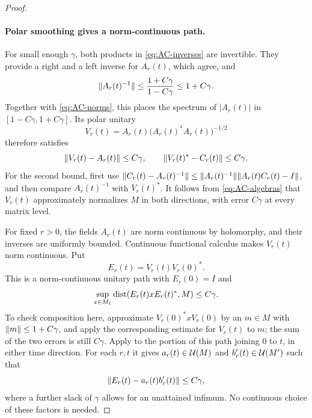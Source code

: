 \begin{proof}
\paragraph{Polar smoothing gives a norm-continuous path.}
For small enough $\gamma$, both products in \eqref{eq:AC-inverses} are
invertible.  They provide a right and a left inverse for $A_r(t)$,
which agree, and
\[
 \lVert A_r(t)^{-1}\rVert\leq\frac{1+C\gamma}{1-C\gamma}
                                      \leq1+C\gamma.
\]
Together with \eqref{eq:AC-norms}, this places the spectrum of
$|A_r(t)|$ in $[1-C\gamma,1+C\gamma]$.  Its polar unitary
\[
 V_r(t)=A_r(t)\bigl(A_r(t)^*A_r(t)\bigr)^{-1/2}
\]
therefore satisfies
\begin{equation}\label{eq:polar-AC-errors}
 \lVert V_r(t)-A_r(t)\rVert\leq C\gamma,
 \qquad \lVert V_r(t)^*-C_r(t)\rVert\leq C\gamma.
\end{equation}
For the second bound, first use
$\lVert C_r(t)-A_r(t)^{-1}\rVert
 \leq\lVert A_r(t)^{-1}\rVert\lVert A_r(t)C_r(t)-I\rVert$,
and then compare $A_r(t)^{-1}$ with $V_r(t)^*$.
It follows from \eqref{eq:AC-algebras} that $V_r(t)$ approximately
normalizes $M$ in both directions, with error $C\gamma$ at every
matrix level.

For fixed $r>0$, the fields $A_r(t)$ are norm continuous by
holomorphy, and their inverses are uniformly bounded.  Continuous
functional calculus makes $V_r(t)$ norm continuous.  Put
\[
 E_r(t)=V_r(t)V_r(0)^*.
\]
This is a norm-continuous unitary path with $E_r(0)=I$ and
\begin{equation}\label{eq:Er-normalizer-error}
 \sup_{x\in M_1}\operatorname{dist}(E_r(t)xE_r(t)^*,M)\leq C\gamma.
\end{equation}
To check composition here, approximate $V_r(0)^*xV_r(0)$ by an
$m\in M$ with $\lVert m\rVert\leq1+C\gamma$, and apply the corresponding
estimate for $V_r(t)$ to $m$; the sum of the two errors is still
$C\gamma$.  Apply  to the portion of
this path joining $0$ to $t$, in either time direction.  For each
$r,t$ it gives $a_r(t)\in\mathcal U(M)$ and $b_r'(t)\in\mathcal U(M')$ such that
\begin{equation}\label{eq:Er-product-approximation}
 \lVert E_r(t)-a_r(t)b_r'(t)\rVert\leq C\gamma,
\end{equation}
where a further slack of $\gamma$ allows for an unattained infimum.
No continuous choice of these factors is needed.


\end{proof}
